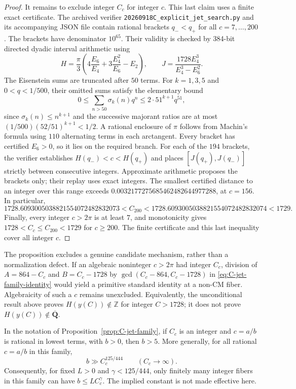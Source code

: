 \begin{proof}
It remains to exclude integer $C_c$ for integer $c$. This last claim uses
a finite exact certificate. The archived verifier
\texttt{20260918C\_explicit\_jet\_search.py} and its accompanying JSON file
contain rational brackets $q_-<q_+$ for all $c=7,\ldots,200$.
The brackets have denominator $10^{65}$. Their validity is checked by
384-bit directed dyadic interval arithmetic using
\[
 H=\frac\pi3\left(4\frac{E_6}{E_4}
       +3\frac{E_4^2}{E_6}-E_2\right),\qquad
 J=\frac{1728E_4^3}{E_4^3-E_6^2}.
\]
The Eisenstein sums are truncated after $50$ terms. For $k=1,3,5$ and
$0<q<1/500$, their omitted sums satisfy the elementary bound
\[
 0\le\sum_{n>50}\sigma_k(n)q^n
 \le2\cdot51^{k+1}q^{51},
\]
since $\sigma_k(n)\le n^{k+1}$ and the successive majorant ratios are
at most $(1/500)(52/51)^{k+1}<1/2$. A rational enclosure of $\pi$ follows
from Machin's formula using $110$ alternating terms in each arctangent.
Every bracket has certified $E_6>0$, so it lies on the required branch.
For each of the $194$ brackets, the verifier establishes
$H(q_-)<c<H(q_+)$ and places
$[J(q_+),J(q_-)]$ strictly between consecutive integers. Approximate
arithmetic proposes the brackets only; their replay uses exact integers.
The smallest certified distance to an integer over this range exceeds
$0.0032177275685462482644977288$, at $c=156$.
In particular,
\[
 1728.6093005038821554072482832073<C_{200}
 <1728.6093005038821554072482832074<1729.
\]
Finally, every integer $c>2\pi$ is at least $7$, and monotonicity gives
$1728<C_c\le C_{200}<1729$ for $c\ge200$. The finite certificate and
this last inequality cover all integer $c$.
\end{proof}

The proposition excludes a genuine candidate mechanism, rather than a
normalization defect. If an algebraic noninteger $c>2\pi$ had integer
$C_c$, division of $A=864-C_c$ and $B=C_c-1728$ by
$\gcd(C_c-864,C_c-1728)$ in \eqref{eq:C-jet-family-identity} would yield
a primitive standard identity at a non-CM fiber. Algebraicity of such a
$c$ remains unexcluded. Equivalently, the unconditional result above
proves $H(y(C))\notin\mathbb Z$ for integer $C>1728$; it does not prove
$H(y(C))\notin\overline{\mathbf Q}$.

\begin{proposition}\label{prop:C-rational-jet}
In the notation of Proposition~\ref{prop:C-jet-family}, if $C_c$ is an
integer and $c=a/b$ is rational in lowest terms, with $b>0$, then $b>5$.
More generally, for all rational $c=a/b$ in this family,
\[
 b\gg C_c^{125/444}\qquad(C_c\longrightarrow\infty).
\]
Consequently, for fixed $L>0$ and $\gamma<125/444$, only finitely many
integer fibers in this family can have $b\le L C_c^\gamma$.
The implied constant is not made effective here.
\end{proposition}

